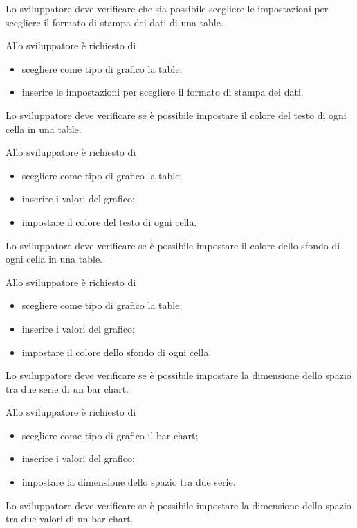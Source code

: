 	Lo sviluppatore deve verificare che sia possibile scegliere le impostazioni per scegliere il formato di stampa dei dati di una table.

		Allo sviluppatore è richiesto di
		\begin{itemize}
			\item scegliere come tipo di grafico la table;
			\item inserire le impostazioni per scegliere il formato di stampa dei dati.
		\end{itemize}

	Lo sviluppatore deve verificare se è possibile impostare il colore del testo di ogni cella in una table.

		Allo sviluppatore è richiesto di
		\begin{itemize}
			\item scegliere come tipo di grafico la table;
			\item inserire i valori del grafico;
			\item impostare il colore del testo di ogni cella.
		\end{itemize}

	Lo sviluppatore deve verificare se è possibile impostare il colore dello sfondo di ogni cella in una table.

		Allo sviluppatore è richiesto di
		\begin{itemize}
			\item scegliere come tipo di grafico la table;
			\item inserire i valori del grafico;
			\item impostare il colore dello sfondo di ogni cella.
		\end{itemize}

	Lo sviluppatore deve verificare se è possibile impostare la dimensione dello spazio tra due serie di un bar chart.

		Allo sviluppatore è richiesto di
		\begin{itemize}
			\item scegliere come tipo di grafico il bar chart;
			\item inserire i valori del grafico;
			\item impostare la dimensione dello spazio tra due serie.
		\end{itemize}

	Lo sviluppatore deve verificare se è possibile impostare la dimensione dello spazio tra due valori di un bar chart.

